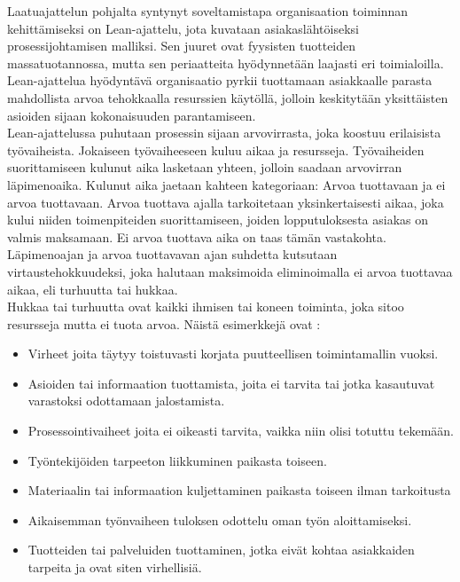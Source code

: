 \documentclass[finnish,12pt,a4paper,pdftex]{article}
\begin{document}
Laatuajattelun pohjalta syntynyt soveltamistapa organisaation toiminnan kehittämiseksi on Lean-ajattelu, jota kuvataan asiakaslähtöiseksi prosessijohtamisen malliksi. Sen juuret ovat fyysisten tuotteiden massatuotannossa, mutta sen periaatteita hyödynnetään laajasti eri toimialoilla. Lean-ajattelua hyödyntävä organisaatio pyrkii tuottamaan asiakkaalle parasta mahdollista arvoa tehokkaalla resurssien käytöllä, jolloin keskitytään yksittäisten asioiden sijaan kokonaisuuden parantamiseen. \citep{leanit}\\

Lean-ajattelussa puhutaan prosessin sijaan arvovirrasta, joka koostuu erilaisista työvaiheista. Jokaiseen työvaiheeseen kuluu aikaa ja resursseja. Työvaiheiden suorittamiseen kulunut aika lasketaan yhteen, jolloin saadaan arvovirran läpimenoaika. Kulunut aika jaetaan kahteen kategoriaan: Arvoa tuottavaan ja ei arvoa tuottavaan. Arvoa tuottava ajalla tarkoitetaan yksinkertaisesti aikaa, joka kului niiden toimenpiteiden suorittamiseen, joiden lopputuloksesta asiakas on valmis maksamaan. Ei arvoa tuottava aika on taas tämän vastakohta. Läpimenoajan ja arvoa tuottavavan ajan suhdetta kutsutaan virtaustehokkuudeksi, joka halutaan maksimoida eliminoimalla ei arvoa tuottavaa aikaa, eli turhuutta tai hukkaa. \citep{leanthinking}\\

\noindent Hukkaa tai turhuutta ovat kaikki ihmisen tai koneen toiminta, joka sitoo resursseja mutta ei tuota arvoa. Näistä esimerkkejä ovat \citep{leanthinking}:
\begin{itemize}
\setlength{\itemsep}{0pt}
    \item Virheet joita täytyy toistuvasti korjata puutteellisen toimintamallin vuoksi.
    \item Asioiden tai informaation tuottamista, joita ei tarvita tai jotka kasautuvat varastoksi odottamaan jalostamista.
    \item Prosessointivaiheet joita ei oikeasti tarvita, vaikka niin olisi totuttu tekemään.
    \item Työntekijöiden tarpeeton liikkuminen paikasta toiseen.
    \item Materiaalin tai informaation kuljettaminen paikasta toiseen ilman tarkoitusta
    \item Aikaisemman työnvaiheen tuloksen odottelu oman työn aloittamiseksi.
    \item Tuotteiden tai palveluiden tuottaminen, jotka eivät kohtaa asiakkaiden tarpeita ja ovat siten virhellisiä.
\end{itemize}
\end{document}
